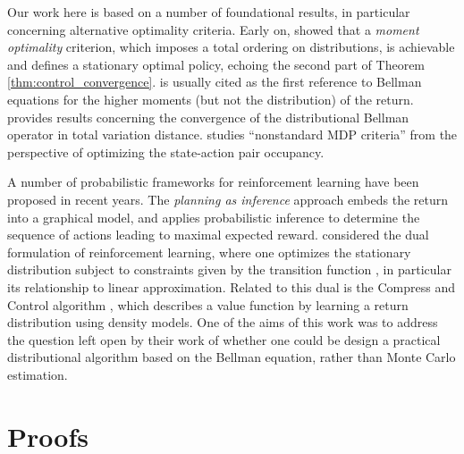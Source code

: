 \documentclass{article}
\begin{document}
Our work here is based on a number of foundational results, in particular concerning alternative optimality criteria. Early on, \citet{jaquette73markov} showed that a \emph{moment optimality} criterion, which imposes a total ordering on distributions, is achievable and defines a stationary optimal policy, echoing the second part of Theorem \ref{thm:control_convergence}. \citet{sobel82variance} is usually cited as the first reference to Bellman equations for the higher moments (but not the distribution) of the return. \citet{chung87discounted} provides results concerning the convergence of the distributional Bellman operator in total variation distance. \citet{white88mean} studies ``nonstandard MDP criteria'' from the perspective of optimizing the state-action pair occupancy.

A number of probabilistic frameworks for reinforcement learning have been proposed in recent years. The \emph{planning as inference} approach \citep{toussaint06probabilistic,hoffman09expectation} embeds the return into a graphical model, and applies probabilistic inference to determine the sequence of actions leading to maximal expected reward. \citet{wang08dual} considered the dual formulation of reinforcement learning, where one optimizes the stationary distribution subject to constraints given by the transition function \citep{puterman94markov}, in particular its relationship to linear approximation. Related to this dual is the Compress and Control algorithm \citet{veness15compress}, which describes a value function by learning a return distribution using density models. One of the aims of this work was to address the question left open by their work of whether one could be design a practical distributional algorithm based on the Bellman equation, rather than Monte Carlo estimation.

\section{Proofs}

%

\setcounter{lem}{0}
\setcounter{thm}{0}
\setcounter{prop}{0}
\end{document}
